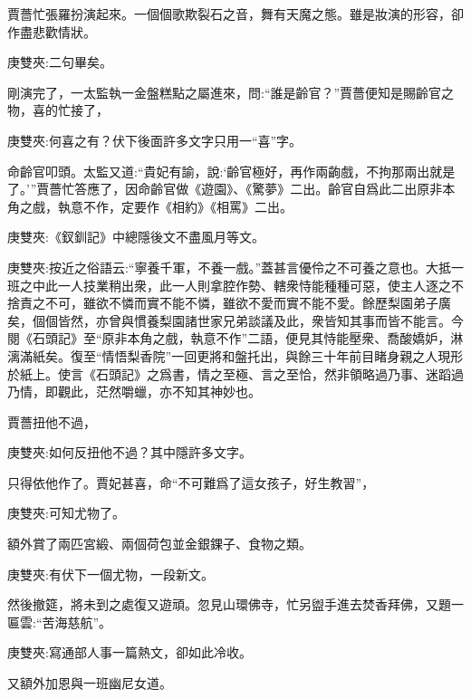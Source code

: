 \begin{parag}
    賈薔忙張羅扮演起來。一個個歌欺裂石之音，舞有天魔之態。雖是妝演的形容，卻作盡悲歡情狀。\begin{note}庚雙夾:二句畢矣。\end{note}剛演完了，一太監執一金盤糕點之屬進來，問:“誰是齡官？”賈薔便知是賜齡官之物，喜的忙接了，\begin{note}庚雙夾:何喜之有？伏下後面許多文字只用一“喜”字。\end{note}命齡官叩頭。太監又道:“貴妃有諭，說:‘齡官極好，再作兩齣戲，不拘那兩出就是了。’”賈薔忙答應了，因命齡官做《遊園》、《驚夢》二出。齡官自爲此二出原非本角之戲，執意不作，定要作《相約》《相罵》二出。\begin{note}庚雙夾:《釵釧記》中總隱後文不盡風月等文。\end{note}\begin{note}庚雙夾:按近之俗語云:“寧養千軍，不養一戲。”蓋甚言優伶之不可養之意也。大抵一班之中此一人技業稍出衆，此一人則拿腔作勢、轄衆恃能種種可惡，使主人逐之不捨責之不可，雖欲不憐而實不能不憐，雖欲不愛而實不能不愛。餘歷梨園弟子廣矣，個個皆然，亦曾與慣養梨園諸世家兄弟談議及此，衆皆知其事而皆不能言。今閱《石頭記》至“原非本角之戲，執意不作”二語，便見其恃能壓衆、喬酸嬌妒，淋漓滿紙矣。復至“情悟梨香院”一回更將和盤托出，與餘三十年前目睹身親之人現形於紙上。使言《石頭記》之爲書，情之至極、言之至恰，然非領略過乃事、迷蹈過乃情，即觀此，茫然嚼蠟，亦不知其神妙也。\end{note}賈薔扭他不過，\begin{note}庚雙夾:如何反扭他不過？其中隱許多文字。\end{note}只得依他作了。賈妃甚喜，命“不可難爲了這女孩子，好生教習”，\begin{note}庚雙夾:可知尤物了。\end{note}額外賞了兩匹宮緞、兩個荷包並金銀錁子、食物之類。\begin{note}庚雙夾:有伏下一個尤物，一段新文。\end{note}然後撤筵，將未到之處復又遊頑。忽見山環佛寺，忙另盥手進去焚香拜佛，又題一匾雲:“苦海慈航”。\begin{note}庚雙夾:寫通部人事一篇熱文，卻如此冷收。\end{note}又額外加恩與一班幽尼女道。
\end{parag}


